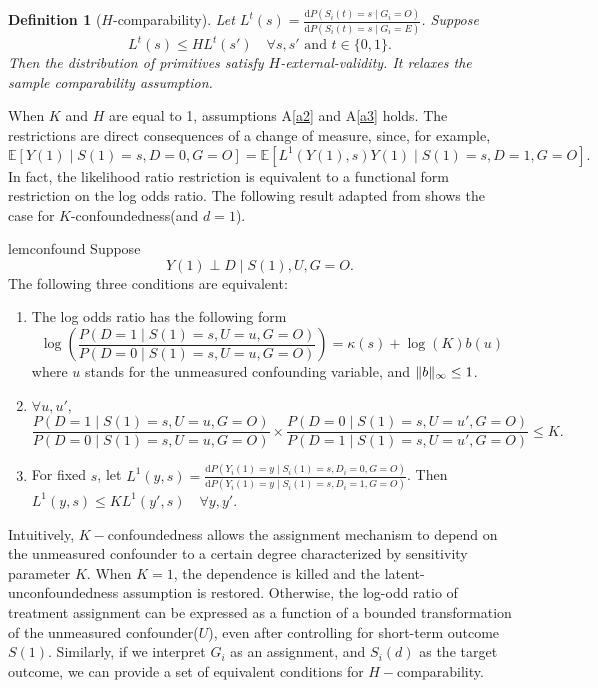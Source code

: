 \documentclass[12pt]{article}
\newtheorem{defn}{Definition}
\newcommand{\Ep}{\mathbb{E}}
\DeclarePairedDelimiter{\norm}{\lVert}{\rVert}
\begin{document}
	\begin{defn}[$H$-comparability]
	 Let $L^t(s) = \frac{\mathrm{d} P(S_i(t) = s \mid G_i = O)}{\mathrm{d} P(S_i(t) = s \mid G_i = E)}$. Suppose $$L^t(s) \leq H L^t(s') \quad \forall s,s' \text{ and } t \in \{0,1\}.$$ Then the distribution of primitives satisfy $H$-external-validity. It relaxes the sample comparability assumption.
	\end{defn}

	When $K$ and $H$ are equal to 1, assumptions A\ref{a2} and A\ref{a3} holds. The restrictions are direct consequences of a change of measure, since, for example, $$\Ep[Y(1) \mid S(1) = s, D = 0, G = O] = \Ep[L^1(Y(1),s) Y(1) \mid S(1) = s, D = 1, G = O].$$ In fact, the likelihood ratio restriction is equivalent to a functional form restriction on the log odds ratio. 
	The following result adapted from \textcite{yadlowsky2018bounds} shows the case for $K$-confoundedness(and $d = 1$).
	
	\begin{restatable}{lem}{confound}
		\label{confound}
		Suppose $$Y(1) \perp D \mid S(1), U, G = O.$$
		The following three conditions are equivalent:
		\begin{enumerate}[label=(\alph*)]
			\item The log odds ratio has the following form $$\log \left(\frac{P(D=1 \mid S(1) = s, U=u, G = O)}{P(D=0 \mid S(1)=s, U=u, G = O)}\right)=\kappa(s)+\log (K) b(u)$$
			where $u$ stands for the unmeasured confounding variable, and $\norm{b}_{\infty} \leq 1$.

			\item $\forall u, u',$ $$\frac{P(D=1 \mid S(1) = s, U=u, G =O)}{P(D=0 \mid S(1)=s, U=u, G = O)} \times\frac{P(D=0 \mid S(1) = s, U=u', G =O)}{P(D=1 \mid S(1)=s, U=u', G = O)} \leq K.$$
			
			\item For fixed $s$, let $L^1(y,s) = \frac{\mathrm{d} P(Y_i(1) = y \mid S_i(1) = s, D_i = 0, G = O)}{\mathrm{d} P(Y_i(1) = y \mid S_i(1) = s, D_i = 1, G = O)}$. Then $L^1(y,s) \leq K L^1(y',s) \quad \forall y,y'$.
		\end{enumerate}
	\end{restatable}
	    
	Intuitively, $K-$confoundedness allows the assignment mechanism to depend on the unmeasured confounder to a certain degree characterized by sensitivity parameter $K$. When $K = 1$, the dependence is killed and the latent-unconfoundedness assumption is restored. Otherwise, the log-odd ratio of treatment assignment can be expressed as a function of a bounded transformation of the unmeasured confounder($U$), even after controlling for short-term outcome $S(1)$. Similarly, if we interpret $G_i$ as an assignment, and $S_i(d)$ as the target outcome, we can provide a set of equivalent conditions for $H-$comparability.
\end{document}
